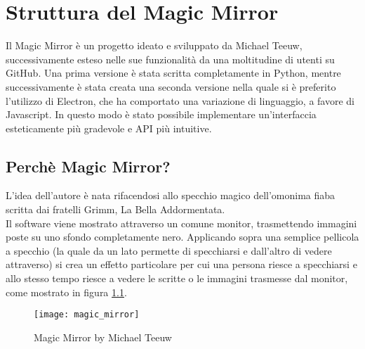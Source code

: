 \chapter{Struttura del Magic Mirror}

Il Magic Mirror \`e un progetto ideato e sviluppato da Michael Teeuw, successivamente esteso nelle sue funzionalit\`a da una moltitudine di utenti su GitHub.
Una prima versione \`e stata scritta completamente in Python, mentre successivamente \`e stata creata una seconda versione nella quale si \`e preferito l'utilizzo di Electron,
che ha comportato una variazione di linguaggio, a favore di Javascript. In questo modo \`e stato possibile implementare un'interfaccia esteticamente pi\`u gradevole
e API pi\`u intuitive.
\\[2\baselineskip]

\section{Perch\`e Magic Mirror?}
L'idea dell'autore \`e nata rifacendosi allo specchio magico dell'omonima fiaba
scritta dai fratelli Grimm, La Bella Addormentata.\\
Il software viene mostrato attraverso un
comune monitor, trasmettendo immagini poste su uno sfondo completamente nero. Applicando sopra
una semplice pellicola a specchio (la quale da un lato permette di specchiarsi e dall'altro di vedere
attraverso) si crea un effetto particolare per cui una persona riesce a specchiarsi
e allo stesso tempo riesce a vedere le scritte o le immagini trasmesse dal monitor,
come mostrato in figura \ref{fig:MM}.
\\[2\baselineskip]
\begin{figure}[H]
    \texttt{[image: magic\_mirror]}
    \caption{Magic Mirror by Michael Teeuw}
    \label{fig:MM}
\end{figure}

